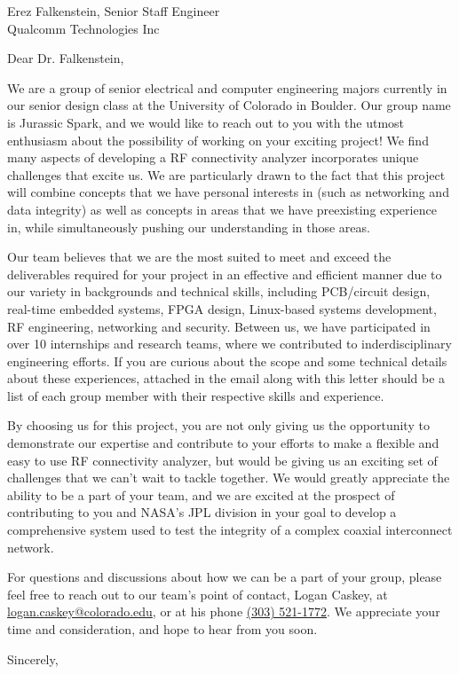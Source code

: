 \documentclass{letter}
\begin{document}
\begin{letter}
{Erez Falkenstein, Senior Staff Engineer\\
Qualcomm Technologies Inc
}

\opening{Dear Dr. Falkenstein,}

We are a group of senior electrical and computer engineering majors currently in our senior design class at the University of Colorado in Boulder. Our group name is Jurassic Spark, and we would like to reach out to you with the utmost enthusiasm about the possibility of working on your exciting project! We find many aspects of developing a RF connectivity analyzer incorporates unique challenges that excite us. We are particularly drawn to the fact that this project will combine concepts that we have personal interests in (such as networking and data integrity) as well as concepts in areas that we have preexisting experience in, while simultaneously pushing our understanding in those areas. 

Our team believes that we are the most suited to meet and exceed the deliverables required for your project in an effective and efficient manner due to our variety in backgrounds and technical skills, including PCB/circuit design, real-time embedded systems, FPGA design, Linux-based systems development, RF engineering, networking and security. Between us, we have participated in over 10 internships and research teams, where we contributed to inderdisciplinary engineering efforts. If you are curious about the scope and some technical details about these experiences, attached in the email along with this letter should be a list of each group member with their respective skills and experience. 

By choosing us for this project, you are not only giving us the opportunity to demonstrate our expertise and contribute to your efforts to make a flexible and easy to use RF connectivity analyzer, but would be giving us an exciting set of challenges that we can't wait to tackle together. We would greatly appreciate the ability to be a part of your team, and we are excited at the prospect of contributing to you and NASA's JPL division in your goal to develop a comprehensive system used to test the integrity of a complex coaxial interconnect network. 

For questions and discussions about how we can be a part of your group, please feel free to reach out to our team's point of contact, Logan Caskey, at \href{mailto:logan.caskey@colorado.edu}{logan.caskey@colorado.edu}, or at his phone \href{tel:+13035211772}{(303) 521-1772}. We appreciate your time and consideration, and hope to hear from you soon.

\vspace{1em}

\closing{Sincerely,}

\end{letter}
\end{document}
